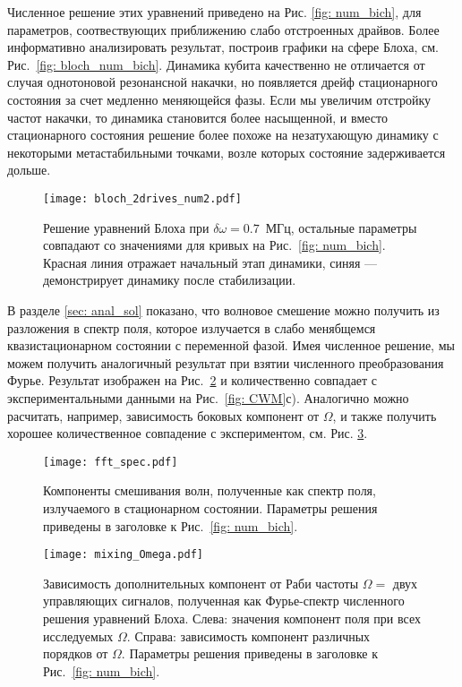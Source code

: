 Численное решение этих уравнений приведено на Рис. \ref{fig: num_bich}, для параметров, соотвествующих приближению слабо отстроенных драйвов. Более информативно анализировать результат, построив графики на сфере Блоха, см. Рис.~\ref{fig: bloch_num_bich}. Динамика кубита качественно не отличается от случая однотоновой резонансной накачки, но появляется дрейф стационарного состояния за счет медленно меняющейся фазы. Если мы увеличим отстройку частот накачки, то динамика становится более насыщенной, и вместо стационарного состояния решение более похоже на незатухающую динамику с некоторыми метастабильными точками, возле которых состояние задерживается дольше. 
\begin{figure}[t]\label{fig: bloch_num_bich2}
	\centering
	\texttt{[image: bloch\_2drives\_num2.pdf]}
	\caption[Численное решение уравнений Блоха для случая бихроматической накачки на сфере Блоха, для случая $\delta\omega \approx \Gamma_1$]{Решение уравнений Блоха при $\delta\omega=0.7$~МГц, остальные параметры совпадают со значениями для кривых на Рис.~\ref{fig: num_bich}. Красная линия отражает начальный этап динамики, синяя --- демонстрирует динамику после стабилизации.}
\end{figure}
В разделе \ref{sec: anal_sol} показано, что волновое смешение можно получить из разложения в спектр поля, которое излучается в слабо менябщемся  квазистационарном состоянии с переменной фазой. Имея численное решение, мы можем получить аналогичный результат при взятии численного преобразования Фурье. Результат изображен на Рис.~\ref{fig: mix_fft} и количественно совпадает с экспериментальными данными на Рис.~\ref{fig: CWM}с). Аналогично можно расчитать, например, зависимость боковых компонент от $\Omega$, и также получить хорошее количественное  совпадение с экспериментом, см. Рис. \ref{fig: mix_fft_omega}.
\begin{figure}[t]\label{fig: mix_fft}
	\centering
	\texttt{[image: fft\_spec.pdf]}
	\caption[Компоненты смешивания волн, полученные как спектр поля, излучаемого в стационарном состоянии]{Компоненты смешивания волн, полученные как спектр поля, излучаемого в стационарном состоянии. Параметры решения приведены в заголовке к Рис.~\ref{fig: num_bich}.}
\end{figure}
\begin{figure}[t]\label{fig: mix_fft_omega}
	\centering
	\texttt{[image: mixing\_Omega.pdf]}
	\caption[Зависимость дополнительных компонент от Раби частоты двух управляющих сигналов]{Зависимость дополнительных компонент от Раби частоты $\Omega = $ двух управляющих сигналов, полученная как Фурье-спектр численного решения уравнений Блоха. Слева: значения компонент поля при всех исследуемых $\Omega$. Справа: зависимость компонент различных порядков от $\Omega$.  Параметры решения приведены в заголовке к Рис.~\ref{fig: num_bich}.}
\end{figure}

